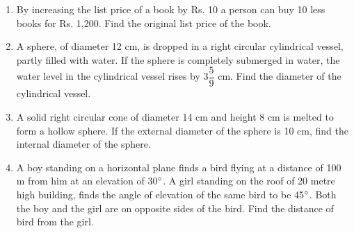 \documentclass[journal,12pt,twocolumn]{IEEEtran}
\renewcommand\thesection{\arabic{section}}
\begin{document}
\begin{enumerate}[label=\thesection.\arabic*.,ref=\thesection.\theenumi]
\item  By increasing the list price of a book by Rs. 10 a person can buy 10 less books for Rs. 1,200. Find the original list price of the book.

\item A sphere, of diameter 12 cm, is dropped in a right circular cylindrical vessel, partly filled with water. If the sphere is completely submerged in water, the water level in the cylindrical vessel rises by {3}$\dfrac{5}{9}$ cm. Find the diameter of the cylindrical vessel.

\item A solid right circular cone of diameter 14 cm and height 8 cm is melted to form a hollow sphere. If the external diameter of the sphere is 10 cm, find the internal diameter of the sphere.

\item A boy standing on a horizontal plane finds a bird flying at a distance of 100 m from him at an elevation of 30$\degree$. A girl standing on the roof of 20 metre high building, finds the angle of elevation of the same bird to be 45$\degree$. Both the boy and the girl are on opposite sides of the bird. Find the distance of bird from the girl.


\end{enumerate}
\end{document}
